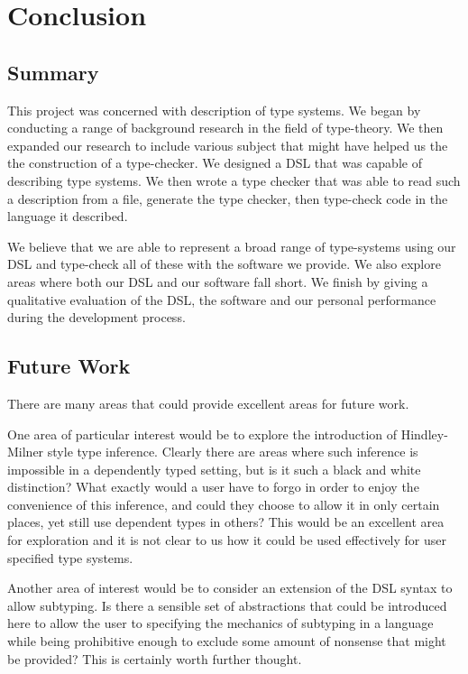 \chapter{Conclusion}

\section{Summary}

This project was concerned with description of type systems. We began
by conducting a range of background research in the field of
type-theory. We then expanded our research to include various subject
that might have helped us the the construction of a type-checker. We
designed a DSL that was capable of describing type systems. We then
wrote a type checker that was able to read such a description from a 
file, generate the type checker, then type-check code in the language it
described.

We believe that we are able to represent a broad range of
type-systems using our DSL and type-check all of these with the software we
provide. We also explore areas where both our DSL and our software
fall short. We finish by giving a qualitative evaluation of the DSL,
the software and our personal performance during the development
process. 

\section{Future Work}

There are many areas that could provide excellent areas for future
work.

One area of particular interest would be to explore the introduction
of Hindley-Milner style type inference. Clearly there are areas where
such inference is impossible in a dependently typed setting, but is it
such a black and white distinction? What exactly would a user have to
forgo in order to enjoy the convenience of this inference, and could
they choose to allow it in only certain places, yet still use
dependent types in others? This would be an excellent area for
exploration and it is not clear to us how it could be used effectively
for user specified type systems.

Another area of interest would be to consider an extension of the DSL
syntax to allow subtyping. Is there a sensible set of abstractions
that could be introduced here to allow the user to specifying the
mechanics of subtyping in a language while being prohibitive enough to
exclude some amount of nonsense that might be provided? This is
certainly worth further thought.

